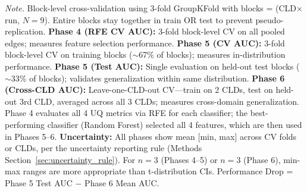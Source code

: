 \begin{table}[H]
\centering
\small
\caption{Ensemble Classifier Performance Across Validation Phases (Block-Level Cross-Validation)}
\label{tab:rq2_ensemble_performance}
\begin{threeparttable}
\setlength{\tabcolsep}{4pt}
\begin{tablenotes}
\small
\item \textit{Note.} Block-level cross-validation using 3-fold GroupKFold with blocks = (CLD$\times$run, $N=9$). Entire blocks stay together in train OR test to prevent pseudo-replication.
\textbf{Phase 4 (RFE CV AUC):} 3-fold block-level CV on all pooled edges; measures feature selection performance.
\textbf{Phase 5 (CV AUC):} 3-fold block-level CV on training blocks ($\sim$67\% of blocks); measures in-distribution performance.
\textbf{Phase 5 (Test AUC):} Single evaluation on held-out test blocks ($\sim$33\% of blocks); validates generalization within same distribution.
\textbf{Phase 6 (Cross-CLD AUC):} Leave-one-CLD-out CV---train on 2 CLDs, test on held-out 3rd CLD, averaged across all 3 CLDs; measures cross-domain generalization.
Phase 4 evaluates all 4 UQ metrics via RFE for each classifier; the best-performing classifier (Random Forest) selected all 4 features, which are then used in Phases 5--6. 
\textbf{Uncertainty:} All phases show mean [min, max] across CV folds or CLDs, per the uncertainty reporting rule (Methods Section~\ref{sec:uncertainty_rule}). For $n=3$ (Phases 4--5) or $n=3$ (Phase 6), min-max ranges are more appropriate than t-distribution CIs.
Performance Drop = Phase 5 Test AUC $-$ Phase 6 Mean AUC.
\end{tablenotes}
\end{threeparttable}
\end{table}

